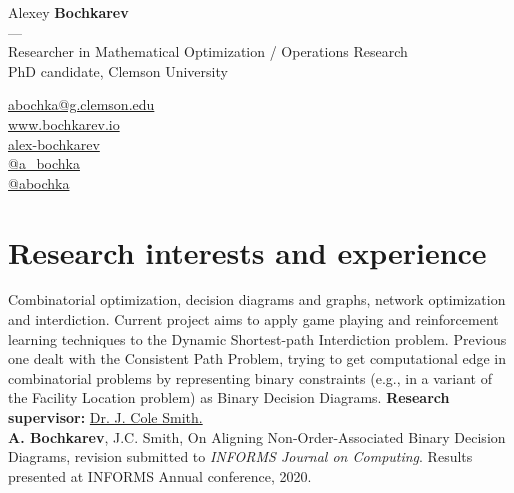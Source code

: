 \documentclass[11pt]{article} \usepackage{geometry} %
\begin{document}
  \begin{minipage}[c]{0.74\textwidth}
    \centering
    {\LARGE Alexey \textbf{Bochkarev}}\\
    ---\\
    Researcher in Mathematical Optimization / Operations Research\\
    PhD candidate, Clemson University
  \end{minipage}\hfill%
  \begin{minipage}{0.26\textwidth}
    \faEnvelope \href{mailto:abochka@g.clemson.edu}{abochka@g.clemson.edu}\\
    \faGlobe \href{https://www.bochkarev.io}{www.bochkarev.io}\\
    \faGithub \href{https://github.com/alex-bochkarev}{alex-bochkarev}\\
    \faTwitter \href{https://twitter.com/a_bochka}{@a\_bochka}\\
    \faTelegram \href{https://t.me/abochka}{@abochka}
  \end{minipage}

 \section*{Research interests and experience}
 Combinatorial optimization, decision diagrams and graphs, network optimization
 and interdiction. Current project aims to apply game playing and reinforcement
 learning techniques to the Dynamic Shortest-path Interdiction problem. Previous
 one dealt with the Consistent Path Problem, trying to get computational edge in
 combinatorial problems by representing binary constraints (e.g., in a variant
 of the Facility Location problem) as Binary Decision Diagrams.
 \textbf{Research supervisor:}
 \href{https://scholar.google.com/citations?user=87CaUHYAAAAJ&hl=en}{Dr. J. Cole
   Smith.}\vspace{0.5em}\\
 \faFile*[regular] \textbf{A. Bochkarev}, J.C. Smith, On Aligning
 Non-Order-Associated Binary Decision Diagrams, revision submitted to \textit{INFORMS
   Journal on
   Computing}. Results presented at INFORMS Annual conference, 2020.\\
\end{document}
